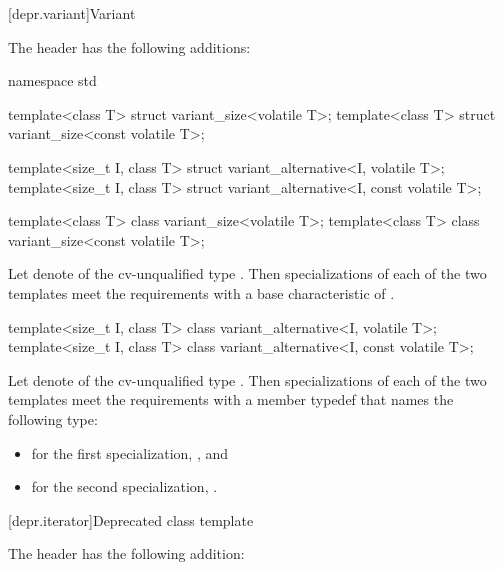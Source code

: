 [depr.variant]{Variant}

\pnum
The header  has the following additions:

\begin{codeblock}
namespace std {
  template<class T> struct variant_size<volatile T>;
  template<class T> struct variant_size<const volatile T>;

  template<size_t I, class T> struct variant_alternative<I, volatile T>;
  template<size_t I, class T> struct variant_alternative<I, const volatile T>;
}
\end{codeblock}

\begin{itemdecl}
template<class T> class variant_size<volatile T>;
template<class T> class variant_size<const volatile T>;
\end{itemdecl}

\begin{itemdescr}
\pnum
Let  denote 
of the cv-unqualified type .
Then specializations of each of the two templates meet
the  requirements
with a base characteristic of .
\end{itemdescr}

\begin{itemdecl}
template<size_t I, class T> class variant_alternative<I, volatile T>;
template<size_t I, class T> class variant_alternative<I, const volatile T>;
\end{itemdecl}

\begin{itemdescr}
\pnum
Let  denote 
of the cv-unqualified type .
Then specializations of each of the two templates meet
the  requirements
with a member typedef  that names the following type:
\begin{itemize}
\item for the first specialization, , and
\item for the second specialization, .
\end{itemize}
\end{itemdescr}

[depr.iterator]{Deprecated  class template}

\pnum
The header  has the following addition:

